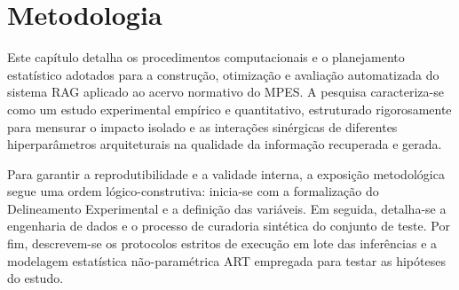 \section{Metodologia}

Este capítulo detalha os procedimentos computacionais e o planejamento estatístico adotados para a construção, otimização e avaliação automatizada do sistema RAG aplicado ao acervo normativo do MPES. A pesquisa caracteriza-se como um estudo experimental empírico e quantitativo, estruturado rigorosamente para mensurar o impacto isolado e as interações sinérgicas de diferentes hiperparâmetros arquiteturais na qualidade da informação recuperada e gerada.

Para garantir a reprodutibilidade e a validade interna, a exposição metodológica segue uma ordem lógico-construtiva: inicia-se com a formalização do Delineamento Experimental e a definição das variáveis. Em seguida, detalha-se a engenharia de dados e o processo de curadoria sintética do conjunto de teste. Por fim, descrevem-se os protocolos estritos de execução em lote das inferências e a modelagem estatística não-paramétrica ART empregada para testar as hipóteses do estudo.
